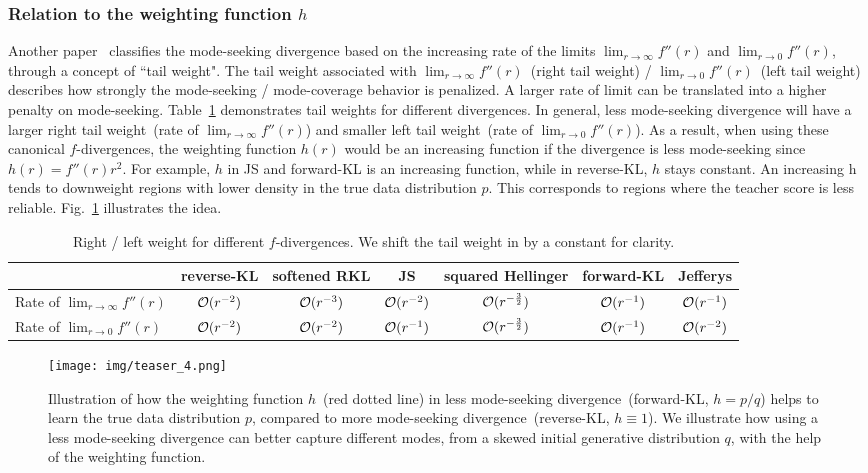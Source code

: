 \subsubsection{Relation to the weighting function $h$}
Another paper~\cite{Shannon2020NonsaturatingGT} classifies the mode-seeking divergence based on the increasing rate of the limits $ \lim_{r\to \infty}f''(r)$ and $ \lim_{r\to 0}f''(r)$, through a concept of ``tail weight". The tail weight associated with $ \lim_{r\to \infty}f''(r)$~(right tail weight) / $ \lim_{r\to 0}f''(r)$~(left tail weight) describes how strongly the mode-seeking / mode-coverage behavior is penalized. A larger rate of limit can be translated into a higher penalty on mode-seeking. Table~\ref{tab:tail-weight-rate} demonstrates tail weights for different divergences. In general, less mode-seeking divergence will have a larger right tail weight~(rate of $\lim_{r\to \infty}f''(r)$) and smaller left tail weight~(rate of $\lim_{r\to 0}f''(r)$). As a result, when using these canonical $f$-divergences, the weighting function $h(r)$ would be an increasing function if the divergence is less mode-seeking since $h(r)= f''(r)r^2$. For example, $h$ in JS and forward-KL is an increasing function, while in reverse-KL, $h$ stays constant. An increasing h tends to downweight regions with lower density in the true data distribution $p$. This corresponds to regions where the teacher score is less reliable. Fig.~\ref{fig:teasdr-2} illustrates the idea.

\begin{table}[h]
    \centering
    \begin{tabular}{l c c c c c c}
    \toprule
     & reverse-KL & softened RKL & JS & squared Hellinger & forward-KL & Jefferys  \\
    \midrule
    Rate of $ \lim_{r\to \infty}f''(r)$ & ${\mathcal{O}}(r^{-2})$& ${\mathcal{O}}(r^{-3})$ & ${\mathcal{O}}(r^{-2})$ & ${\mathcal{O}}(r^{-\frac{3}{2}})$ & ${\mathcal{O}}(r^{-1})$ & ${\mathcal{O}}(r^{-1})$\\
    Rate of $ \lim_{r\to 0}f''(r)$& ${\mathcal{O}}(r^{-2})$& ${\mathcal{O}}(r^{-2})$ & ${\mathcal{O}}(r^{-1})$ & ${\mathcal{O}}(r^{-\frac{3}{2}})$ & ${\mathcal{O}}(r^{-1})$ & ${\mathcal{O}}(r^{-2})$\\
    \bottomrule
    \end{tabular}
    \caption{Right / left weight for different $f$-divergences. We shift the tail weight in \cite{Shannon2020NonsaturatingGT} by a constant for clarity.}
    \label{tab:tail-weight-rate}
\end{table}


 
\begin{figure}
    \centering
    \texttt{[image: img/teaser\_4.png]}
    \caption{Illustration of how the weighting function $h$~(\textcolor{myred}{red dotted line}) in less mode-seeking divergence~(forward-KL, $h = p/q$) helps to learn the true data distribution $ p$, compared to more mode-seeking divergence~(reverse-KL, $h \equiv 1$). We illustrate how using a less mode-seeking divergence can better capture different modes, from a skewed initial generative distribution $q$, with the help of the weighting function.}
    \label{fig:teasdr-2}
\end{figure}

